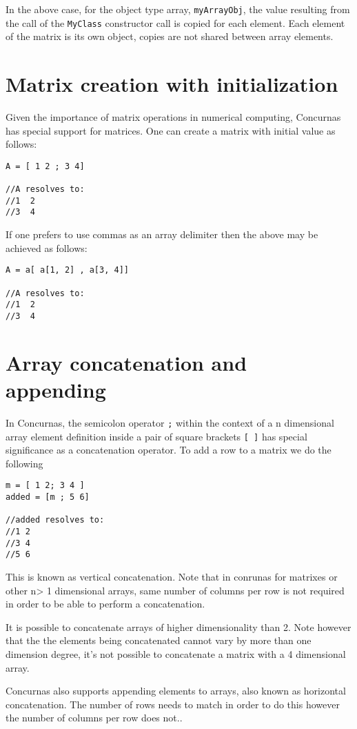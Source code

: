 \documentclass[conc-doc]{subfiles}
\begin{document}
In the above case, for the object type array, \lstinline{myArrayObj}, the value resulting from the call of the \lstinline{MyClass} constructor call is copied for each element. Each element of the matrix is its own object, copies are not shared between array elements.

\section{Matrix creation with initialization}
Given the importance of matrix operations in numerical computing, Concurnas has special support for matrices. One can create a matrix with initial value as follows:
\begin{lstlisting}
A = [ 1 2 ; 3 4]

//A resolves to:
//1  2
//3  4
\end{lstlisting}

If one prefers to use commas as an array delimiter then the above may be achieved as follows:
\begin{lstlisting}
A = a[ a[1, 2] , a[3, 4]]

//A resolves to:
//1  2
//3  4
\end{lstlisting}

\section{Array concatenation and appending}
In Concurnas, the semicolon operator \lstinline{;} within the context of a n dimensional array element definition inside a pair of square brackets \lstinline{[ ]} has special significance as a concatenation operator. To add a row to a matrix we do the following
\begin{lstlisting}
m = [ 1 2; 3 4 ]
added = [m ; 5 6]

//added resolves to:
//1 2
//3 4
//5 6
\end{lstlisting}

This is known as vertical concatenation. Note that in conrunas for matrixes or other n> 1 dimensional arrays, same number of columns per row is not required in order to be able to perform a concatenation.

It is possible to concatenate arrays of higher dimensionality than 2. Note however that the the elements being concatenated cannot vary by more than one dimension degree, it's not possible to concatenate a matrix with a 4 dimensional array.

Concurnas also supports appending elements to arrays, also known as horizontal concatenation. The number of rows needs to match in order to do this however the number of columns per row does not..
\end{document}

